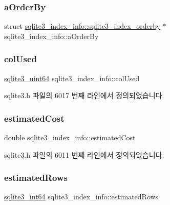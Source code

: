 \subsubsection{\texorpdfstring{a\+Order\+By}{aOrderBy}}
{\footnotesize\ttfamily struct \hyperlink{structsqlite3__index__info_1_1sqlite3__index__orderby}{sqlite3\+\_\+index\+\_\+info\+::sqlite3\+\_\+index\+\_\+orderby} $\ast$ sqlite3\+\_\+index\+\_\+info\+::a\+Order\+By}

\mbox{\label{structsqlite3__index__info_a99787169e2f78c0728bdb339c4107a2e}} 
\subsubsection{\texorpdfstring{col\+Used}{colUsed}}
{\footnotesize\ttfamily \hyperlink{sqlite3_8h_a181c20ecfd72bc6627635746d382c610}{sqlite3\+\_\+uint64} sqlite3\+\_\+index\+\_\+info\+::col\+Used}



sqlite3.\+h 파일의 6017 번째 라인에서 정의되었습니다.

\mbox{\label{structsqlite3__index__info_aa8b4fe1d2ee38aab57ba5e1da00d7830}} 
\subsubsection{\texorpdfstring{estimated\+Cost}{estimatedCost}}
{\footnotesize\ttfamily double sqlite3\+\_\+index\+\_\+info\+::estimated\+Cost}



sqlite3.\+h 파일의 6011 번째 라인에서 정의되었습니다.

\mbox{\label{structsqlite3__index__info_adcdf25dcf9848a6fedf539bb9c921b7f}} 
\subsubsection{\texorpdfstring{estimated\+Rows}{estimatedRows}}
{\footnotesize\ttfamily \hyperlink{sqlite3_8h_a0a4d3e6c1ad46f90e746b920ab6ca0d2}{sqlite3\+\_\+int64} sqlite3\+\_\+index\+\_\+info\+::estimated\+Rows}



